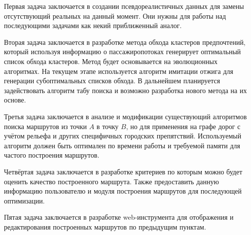 Первая задача заключается в создании псевдореалистичных данных для замены отсутствующий реальных 
на данный момент. Они нужны для работы над последующими задачами как некий приближенный аналог.

Вторая задача заключается в разработке метода обхода кластеров предпочтений, который используя 
информацию о пассажиропотоках генерирует оптимальный список обхода кластеров. Метод будет 
основывается на эволюционных алгоритмах. На текущем этапе используется алгоритм имитации отжига 
для генерации субоптимальных списков обхода. В дальнейшем планируется задействовать алгоритм 
табу поиска и возможно разработка нового метода на их основе.

Третья задача заключается в анализе и модификации существующий алгоритмов поиска маршрутов из 
точки \( A \) в точку \( B \), но для применения на графе дорог с учётом рельефа и других 
специфичных городских препятствий. Используемый алгоритм должен быть оптимален по времени работы 
и требуемой памяти для частого построения маршрутов.

Четвёртая задача заключается в разработке критериев по которым можно будет оценить качество 
построенного маршрута. Также предоставить данную информацию пользователю и модуля построения 
маршрутов для последующей оптимизации.

Пятая задача заключается в разработке web-инструмента для отображения и редактирования построенных 
маршрутов по предыдущим пунктам.

